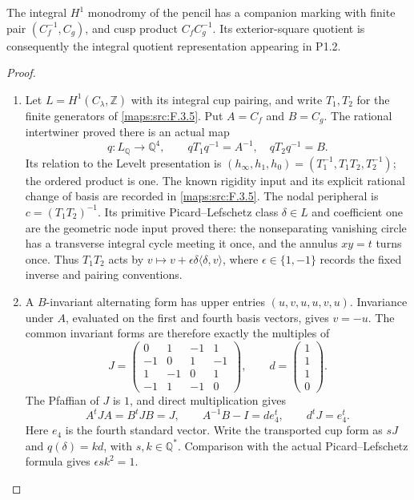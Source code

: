 \begin{theorem}\label{night:P1.7}
The integral $H^1$ monodromy of the pencil has a companion marking with
finite pair $(C_f^{-1},C_g)$, and cusp product $C_fC_g^{-1}$.
Its exterior-square quotient is consequently the integral quotient
representation appearing in P1.2.
\end{theorem}
\begin{proof}
\begin{enumerate}[label=\arabic*.]
\item Let $L=H^1(C_\lambda,\mathbb Z)$ with its integral cup pairing,
and write $T_1,T_2$ for the finite generators of
\cref{maps:src:F.3.5}. Put $A=C_f$ and $B=C_g$.
The rational intertwiner proved there is an actual map
\[
 q:L_{\mathbb Q}\longrightarrow\mathbb Q^4,
 \qquad qT_1q^{-1}=A^{-1},\quad qT_2q^{-1}=B.
\]
Its relation to the Levelt presentation is
$(h_\infty,h_1,h_0)=(T_1^{-1},T_1T_2,T_2^{-1})$;
the ordered product is one. The known rigidity input and its explicit
rational change of basis are recorded in \cref{maps:src:F.3.5}.
The nodal peripheral is $c=(T_1T_2)^{-1}$. Its primitive
Picard--Lefschetz class $\delta\in L$ and coefficient one are the
geometric node input proved there: the nonseparating vanishing circle
has a transverse integral cycle meeting it once, and the annulus
$xy=t$ turns once. Thus $T_1T_2$ acts by
$v\mapsto v+\epsilon\delta\langle\delta,v\rangle$,
where $\epsilon\in\{1,-1\}$ records the fixed inverse and pairing
conventions.

\item A $B$-invariant alternating form has upper entries
$(u,v,u,u,v,u)$. Invariance under $A$, evaluated on the first and
fourth basis vectors, gives $v=-u$. The common invariant forms are
therefore exactly the multiples of
\[
 J=\begin{pmatrix}
 0&1&-1&1\\-1&0&1&-1\\1&-1&0&1\\-1&1&-1&0
 \end{pmatrix},\qquad
 d=\begin{pmatrix}1\\1\\1\\0\end{pmatrix}.
\]
The Pfaffian of $J$ is $1$, and direct multiplication gives
\[
 A^tJA=B^tJB=J,\qquad
 A^{-1}B-I=d e_4^t,\qquad d^tJ=e_4^t.
\]
Here $e_4$ is the fourth standard vector. Write the transported cup
form as $sJ$ and $q(\delta)=k d$, with $s,k\in\mathbb Q^*$.
Comparison with the actual Picard--Lefschetz formula gives
$\epsilon s k^2=1$.


\end{enumerate}
\end{proof}
